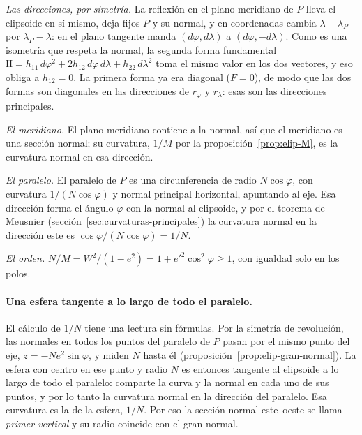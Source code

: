 \begin{demostracion}
\emph{Las direcciones, por simetría.} La reflexión en el plano meridiano de \(P\) lleva el
elipsoide en sí mismo, deja fijos \(P\) y su normal, y en coordenadas cambia
\(\lambda-\lambda_P\) por \(\lambda_P-\lambda\): en el plano tangente manda
\((d\varphi,d\lambda)\) a \((d\varphi,-d\lambda)\). Como es una isometría que respeta la
normal, la segunda forma fundamental
\(\mathrm{II}=h_{11}\,d\varphi^2+2h_{12}\,d\varphi\,d\lambda+h_{22}\,d\lambda^2\) toma el mismo
valor en los dos vectores, y eso obliga a \(h_{12}=0\). La primera forma ya era diagonal
(\(F=0\)), de modo que las dos formas son diagonales en las direcciones de \(r_\varphi\) y
\(r_\lambda\): esas son las direcciones principales.

\emph{El meridiano.} El plano meridiano contiene a la normal, así que el meridiano es una
sección normal; su curvatura, \(1/M\) por la proposición~\ref{prop:elip-M}, es la curvatura
normal en esa dirección.

\emph{El paralelo.} El paralelo de \(P\) es una circunferencia de radio \(N\cos\varphi\), con
curvatura \(1/(N\cos\varphi)\) y normal principal horizontal, apuntando al eje. Esa
dirección forma el ángulo \(\varphi\) con la normal al elipsoide, y por el teorema de
Meusnier (sección~\ref{sec:curvaturas-principales}) la curvatura normal en la dirección este
es \(\cos\varphi/(N\cos\varphi)=1/N\).

\emph{El orden.} \(N/M=W^2/(1-e^2)=1+e'^2\cos^2\varphi\ge1\), con igualdad solo en los polos.
\end{demostracion}

\paragraph{Una esfera tangente a lo largo de todo el paralelo.} El cálculo de \(1/N\) tiene
una lectura sin fórmulas. Por la simetría de revolución, las normales en todos los puntos del
paralelo de \(P\) pasan por el mismo punto del eje, \(z=-Ne^2\sin\varphi\), y miden \(N\)
hasta él (proposición~\ref{prop:elip-gran-normal}). La esfera con centro en ese punto y radio
\(N\) es entonces tangente al elipsoide a lo largo de todo el paralelo: comparte la curva y la
normal en cada uno de sus puntos, y por lo tanto la curvatura normal en la dirección del
paralelo. Esa curvatura es la de la esfera, \(1/N\). Por eso la sección normal este--oeste se
llama \emph{primer vertical} y su radio coincide con el gran normal.


